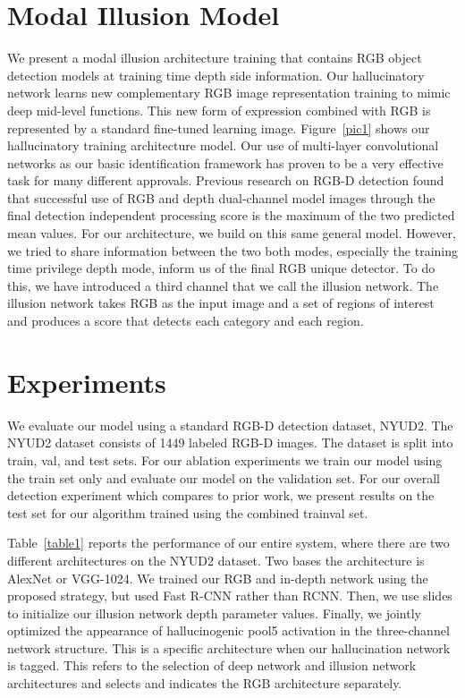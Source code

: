 \documentclass[10pt,twocolumn,letterpaper]{article}
\begin{document}
\section{Modal Illusion Model}
We present a modal illusion architecture training that contains RGB object detection models at training time depth side information. Our hallucinatory network learns new complementary RGB image representation training to mimic deep mid-level functions. This new form of expression combined with RGB is represented by a standard fine-tuned learning image. Figure~\ref{pic1} shows our hallucinatory training architecture model. Our use of multi-layer convolutional networks as our basic identification framework has proven to be a very effective task for many different approvals. Previous research on RGB-D detection found that successful use of RGB and depth dual-channel model images through the final detection independent processing score is the maximum of the two predicted mean values. For our architecture, we build on this same general model. However, we tried to share information between the two both modes, especially the training time privilege depth mode, inform us of the final RGB unique detector. To do this, we have introduced a third channel that we call the illusion network. The illusion network takes RGB as the input image and a set of regions of interest and produces a score that detects each category and each region.
\section {Experiments}
We evaluate our model using a standard RGB-D detection dataset, NYUD2. The NYUD2 dataset consists of 1449 labeled RGB-D images. The dataset is split into train, val, and test  sets. For our ablation experiments we train our model using the train set only and evaluate our model on the validation set. For our overall detection experiment which compares to prior work, we present results on the test set for our algorithm trained using the combined trainval set.
\par Table~\ref{table1} reports the performance of our entire system, where there are two different architectures on the NYUD2 dataset. Two bases the architecture is AlexNet or VGG-1024. We trained our RGB and in-depth network using the proposed strategy, but used Fast R-CNN rather than RCNN. Then, we use slides to initialize our illusion network depth parameter values. Finally, we jointly optimized the appearance of hallucinogenic pool5 activation in the three-channel network structure. This is a specific architecture when our hallucination network is tagged. This refers to the selection of deep network and illusion network architectures and selects and indicates the RGB architecture separately.
\end{document}
